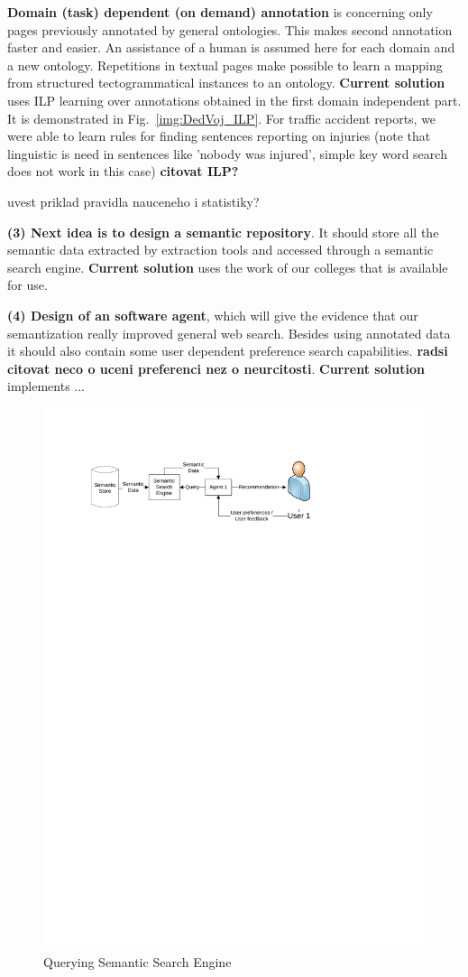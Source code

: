 \documentclass{www2009-submission}
\begin{document}
\textbf{Domain (task) dependent (on demand) annotation} is concerning only pages previously annotated by general ontologies. This makes second annotation faster and easier. An assistance of a human is assumed here for each domain and a new ontology. Repetitions in textual pages make possible to learn a mapping from structured tectogrammatical instances to an ontology. %
{\bf Current solution} uses ILP learning over annotations obtained in the first domain independent part. It is demonstrated in Fig.~\ref{img:DedVoj_ILP}. For traffic accident reports, we were able to learn rules for finding sentences reporting on injuries (note that linguistic is need in sentences like 'nobody was injured', simple key word search does not work in this case) {\bf citovat ILP?}

uvest priklad pravidla nauceneho i statistiky?

\textbf{(3) Next idea is to design a semantic repository}. It should store all the semantic data extracted by extraction tools and accessed through a semantic search engine. 
{\bf Current solution} uses the work of our colleges \cite{biblio:DoTySemanticWeb2007} that is available for use.


\textbf{(4) Design of an software agent}, which will give the evidence that our semantization really improved general web search. Besides using annotated data it should also contain some user dependent preference search capabilities. {\bf radsi citovat neco o uceni preferenci nez o neurcitosti}. {\bf Current solution} implements ...


\begin{figure}
\centering
\includegraphics[width=\hsize, height=.3\hsize]{img/UserSearch}
\caption{Querying Semantic Search Engine}
\label{img:UserSearch}
\end{figure}
 
\end{document}
